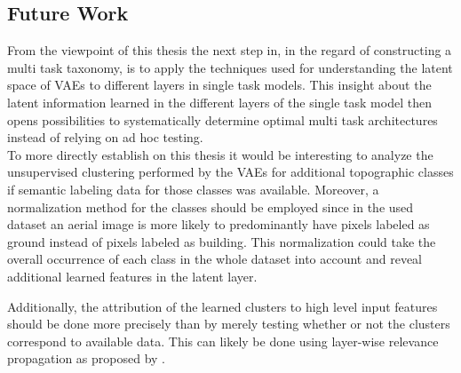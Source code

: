 \subsection{Future Work}

From the viewpoint of this thesis the next step in, in the regard of constructing a multi task taxonomy, is to apply
the techniques used for understanding the latent space of VAEs to different layers in single task models. This insight
about the latent information learned in the different layers of the single task model then opens possibilities
to systematically determine optimal multi task architectures instead of relying on ad hoc testing.\\

To more directly establish on this thesis it would be interesting to analyze the unsupervised clustering performed by
the VAEs for additional topographic classes if semantic labeling data for those classes was available.
Moreover, a normalization method for the classes should be employed since in the used dataset an aerial
image is more likely to predominantly have pixels labeled as ground instead of pixels labeled as building.
This normalization could take the overall occurrence of each class in the whole dataset into account and reveal
additional learned features in the latent layer.

Additionally, the attribution of the learned clusters to high level input features should be done more precisely 
than by merely testing whether or not the clusters correspond to available data. This can likely be done using 
layer-wise relevance propagation as proposed by \textcite{2015-bach-on}.


